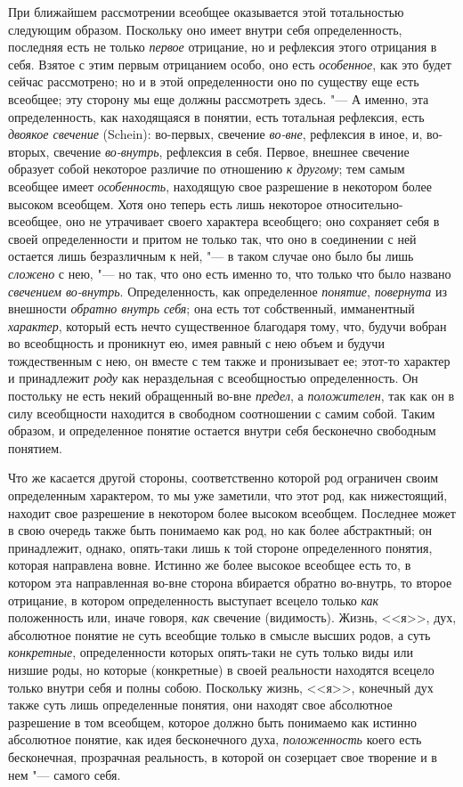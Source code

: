 {При ближайшем рассмотрении всеобщее оказывается этой
тотальностью следующим образом. Поскольку оно имеет внутри себя
определенность, последняя есть не только
{\em первое} отрицание,
но и рефлексия этого отрицания в себя. Взятое с этим первым отрицанием
особо, оно есть {\em особенное},
как это будет сейчас рассмотрено; но и в этой определенности
оно по существу еще есть всеобщее; эту сторону мы еще должны рассмотреть
здесь. "--- \label{bkm:bm23a}А именно, эта определенность, как
находящаяся в понятии, есть тотальная рефлексия, есть
{\em двоякое свечение} (Schein):
во-первых, свечение
{\em во-вне}, рефлексия в
иное, и, во-вторых, свечение
{\em во-внутрь},
рефлексия в себя. Первое, внешнее свечение образует собой
некоторое различие по отношению {\em к
другому}; тем самым всеобщее имеет
{\em особенность},
находящую свое разрешение в некотором более высоком всеобщем.
Хотя оно теперь есть лишь некоторое относительно-всеобщее, оно не
утрачивает своего характера всеобщего; оно сохраняет себя в своей
определенности и притом не только так, что оно в соединении с ней остается
лишь безразличным к ней, "--- в таком случае оно было бы лишь
{\em сложено} с нею, "---
но так, что оно есть именно то, что только что было названо
{\em свечением во-внутрь}.
Определенность, как определенное
{\em понятие},
{\em повернута} из
внешности {\em обратно внутрь себя};
она есть тот собственный, имманентный
{\em характер}, который
есть нечто существенное благодаря тому, что, будучи вобран во всеобщность и
проникнут ею, имея равный с нею объем и будучи тождественным с нею, он
вместе с тем также и пронизывает ее; этот-то характер и принадлежит
{\em роду} как
нераздельная с всеобщностью определенность. Он постольку не есть некий
обращенный во-вне {\em предел},
а {\em положителен},
так как он в силу всеобщности находится в свободном
соотношении с самим собой. Таким образом, и определенное понятие остается
внутри себя бесконечно свободным понятием.

Что же касается другой стороны, соответственно которой род
ограничен своим определенным характером, то мы уже заметили, что
этот род, как нижестоящий, находит свое разрешение в
некотором более высоком всеобщем. Последнее может в свою очередь также быть
понимаемо как род, но как более абстрактный; он принадлежит, однако,
опять-таки лишь к той стороне определенного понятия, которая направлена
вовне. Истинно же более высокое всеобщее есть то, в котором эта
направленная во-вне сторона вбирается обратно во-внутрь, то второе
отрицание, в котором определенность выступает всецело только
{\em как} положенность
или, иначе говоря, {\em как}
свечение (видимость). Жизнь, <<я>>, дух, абсолютное понятие не
суть всеобщие только в смысле высших родов, а суть
{\em конкретные},
определенности которых опять-таки не суть только виды или
низшие роды, но которые (конкретные) в своей реальности находятся всецело
только внутри себя и полны собою. Поскольку жизнь, <<я>>, конечный дух также
суть лишь определенные понятия, они находят свое абсолютное разрешение в
том всеобщем, которое должно быть понимаемо как истинно абсолютное понятие,
как идея бесконечного духа,
{\em положенность} коего
есть бесконечная, прозрачная реальность, в которой он созерцает свое
творение и в нем "--- самого себя.

}
